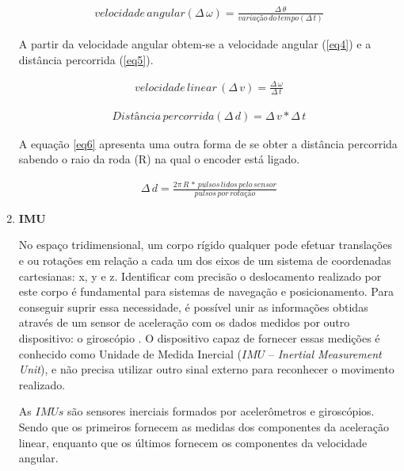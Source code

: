 \begin{enumerate}
          \begin{eqnarray} 
            \label{eq3}
            velocidade\,angular (\Delta\,\omega)= \frac{\Delta\,\theta}{variação\,do\,tempo (\Delta\,t)} 
          \end{eqnarray}

          A partir da velocidade angular obtem-se a velocidade angular (\ref{eq4}) e a distância percorrida (\ref{eq5}).

          \begin{eqnarray} 
            \label{eq4}
            velocidade\,linear\,(\Delta\,v) =\frac{\Delta\,\omega}{\Delta\,t}
          \end{eqnarray}    
          
          \begin{eqnarray} 
            \label{eq5}
            Distância\,percorrida(\Delta\,d)=\Delta\,v *\Delta\,t
          \end{eqnarray}

          A equação \ref{eq6} apresenta uma outra forma de se obter a distância percorrida sabendo o raio da roda (R) na qual o encoder está ligado.

          \begin{eqnarray} 
            \label{eq6}
            \Delta\,d=\frac{2\pi\,R\,*\,pulsos\,lidos\,pelo\,sensor}{pulsos\,por\,rotação} 
          \end{eqnarray}

			  \item \textbf{IMU}

          No espaço tridimensional, um corpo rígido qualquer pode efetuar translações e ou rotações em relação a cada um dos eixos de um sistema de coordenadas cartesianas: x, y e z. Identificar com precisão o deslocamento realizado por este corpo é fundamental para sistemas de navegação e posicionamento. Para conseguir suprir essa necessidade, é possível unir as informações obtidas através de um sensor de aceleração com os dados medidos por outro dispositivo: o giroscópio \cite{cao}. O dispositivo capaz de fornecer essas medições é conhecido como Unidade de Medida Inercial ($IMU$ – \textit{Inertial Measurement Unit}), e não precisa utilizar outro sinal externo para reconhecer o movimento realizado. 

          As $IMUs$ são sensores inerciais formados por acelerômetros e giroscópios. Sendo que os primeiros fornecem as medidas dos componentes da aceleração linear, enquanto que os últimos fornecem os componentes da velocidade angular\cite{sei}. 


\end{enumerate}
